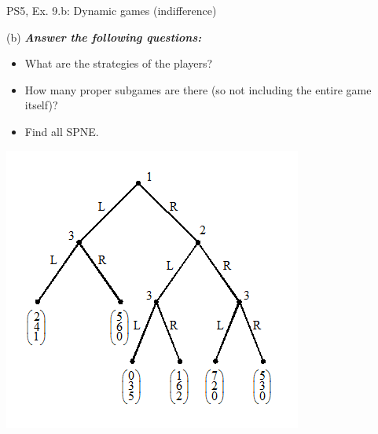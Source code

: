 \begin{frame}{PS5, Ex. 9.b: Dynamic games (indifference)}
  \begin{multicols}{2}
    (b) \textbf{\textit{Answer the following questions:}}
    \begin{itemize}
      \item What are the strategies of the players?
      \item How many proper subgames are there (so not including the entire game itself)?
      \item Find all SPNE.
    \end{itemize}
    \vfill\null \columnbreak
    \includegraphics[width=1.2\columnwidth]{figures/Set_5_figure_2}
    \vfill\null
  \end{multicols}
\end{frame}

